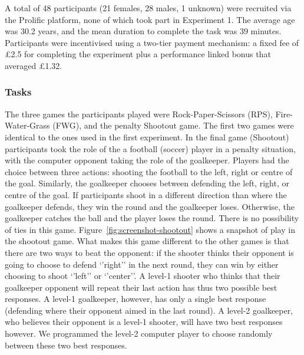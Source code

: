 \documentclass[
  english,
  man,floatsintext]{apa6}
\begin{document}
A total of 48 participants (21 females, 28 males, 1 unknown) were recruited via the Prolific platform, none of which took part in Experiment 1. The average age was 30.2 years, and the mean duration to complete the task was 39 minutes. Participants were incentivised using a two-tier payment mechanism: a fixed fee of £2.5 for completing the experiment plus a performance linked bonus that averaged £1.32.

\hypertarget{tasks-1}{%
\subsubsection{Tasks}\label{tasks-1}}

The three games the participants played were Rock-Paper-Scissors (RPS), Fire-Water-Grass (FWG), and the penalty Shootout game. The first two games were identical to the ones used in the first experiment. In the final game (Shootout) participants took the role of the a football (soccer) player in a penalty situation, with the computer opponent taking the role of the goalkeeper. Players had the choice between three actions: shooting the football to the left, right or centre of the goal. Similarly, the goalkeeper chooses between defending the left, right, or centre of the goal. If participants shoot in a different direction than where the goalkeeper defends, they win the round and the goalkeeper loses. Otherwise, the goalkeeper catches the ball and the player loses the round. There is no possibility of ties in this game. Figure~\ref{fig:screenshot-shootout} shows a snapshot of play in the shootout game. What makes this game different to the other games is that there are two ways to beat the opponent: if the shooter thinks their opponent is going to choose to defend `'right'' in the next round, they can win by either choosing to shoot `'left'' or `'center''. A level-1 shooter who thinks that their goalkeeper opponent will repeat their last action has thus two possible best responses. A level-1 goalkeeper, however, has only a single best response (defending where their opponent aimed in the last round). A level-2 goalkeeper, who believes their opponent is a level-1 shooter, will have two best responses however. We programmed the level-2 computer player to choose randomly between these two best responses.
\end{document}
